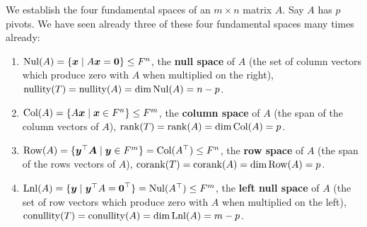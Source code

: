 We establish the four fundamental spaces of an $m\times n$ matrix $A$. Say $A$ has $p$ pivots. We have seen already three of these four fundamental spaces many times already:\\
\begin{enumerate}[!DEF!, start=1]
\item $\operatorname{Nul}(A) = \{\boldsymbol x\mid A\boldsymbol x= \boldsymbol 0\}\le F^n$, the \textbf{null space} of $A$  (the set of column vectors which produce zero with $A$ when multiplied on the right), $\operatorname*{nullity}(T) = \operatorname*{nullity}(A) = \dim\operatorname{Nul}(A) = n-p$.\\
\item $\operatorname{Col}(A) = \{A\boldsymbol x\mid \boldsymbol x\in F^n \}\le F^m$, the \textbf{column space} of $A$ (the span of the column vectors of $A$), $\operatorname*{rank}(T) = \operatorname*{rank}(A) = \dim\operatorname{Col}(A) = p$.\\
\item $\operatorname*{Row}(A) = \{\boldsymbol y^\top \boldsymbol A\mid \boldsymbol y\in F^m \} = \operatorname{Col}(A^\top )\le F^n$, the \textbf{row space} of $A$ (the span of the rows vectors of $A$), $\operatorname*{corank}(T) = \operatorname*{corank}(A) = \dim\operatorname*{Row}(A) = p$.\\
\item $\operatorname*{Lnl}(A) = \{\boldsymbol y\mid \boldsymbol y^\top A=\boldsymbol 0^\top \} = \operatorname{Nul}(A^\top)\le F^m$, the \textbf{left null space} of $A$ (the set of row vectors which produce zero with $A$ when multiplied on the left), $\operatorname*{conullity}(T) = \operatorname*{conullity}(A) = \dim\operatorname*{Lnl}(A) = m-p$.\\
\end{enumerate}

